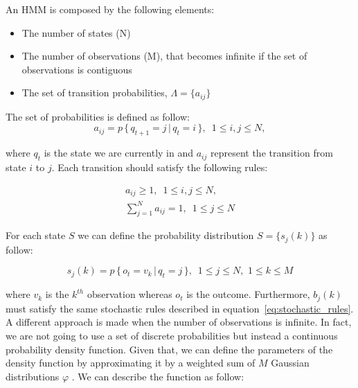 \noindent An HMM is composed by the following elements:

\begin{itemize}
	\item The number of states (N)
	\item The number of observations (M), that becomes infinite if the set of observations is contiguous
	\item The set of transition probabilities, $\Lambda = \{ a_{ij}\}$
\end{itemize}

The set of probabilities is defined as follow:
\begin{equation}
\label{eq:transition_probabilities}
a_{ij} = p \, \{ \, q_{t+1} = j \, | \, q_{t} = i \, \}, \, \, \, 1 \leq i,j \leq N,
\end{equation}

\noindent where $q_{t}$ is the state we are currently in and $a_{ij}$ represent the transition from state $i$ to $j$.
Each transition should satisfy the following rules:

\begin{subequations}
	\label{eq:stochastic_rules}
	\begin{align}
	a_{ij} \geq 1, \, \, \, 1 \leq i,j \leq N, \\
	\sum_{j=1}^{N} a_{ij} = 1, \, \, \, 1 \leq j \leq N
	\end{align}
\end{subequations}

\noindent For each state $S$ we can define the probability distribution $S = \{s_{j}(k)\}$ as follow:

\begin{equation}
s_{j}(k) = p \, \{\, o_{t} = v_{k} \, | \, q_{t} = j \, \}, \, \, \, 1 \leq j \leq N, \,\, 1 \leq k \leq M
\end{equation}

\noindent where $v_k$ is the $k^{th}$ observation whereas $o_{t}$ is the outcome. Furthermore, $b_{j}(k)$ must satisfy the same stochastic rules described in equation~\ref{eq:stochastic_rules}. \\

\noindent A different approach is made when the number of observations is infinite. In fact, we are not going to use a set of discrete probabilities but instead a continuous probability density function. Given that, we can define the parameters of the density function by approximating it by a weighted sum of $M$ Gaussian distributions $\varphi$ \cite{def_hmm}. We can describe the function as follow:

